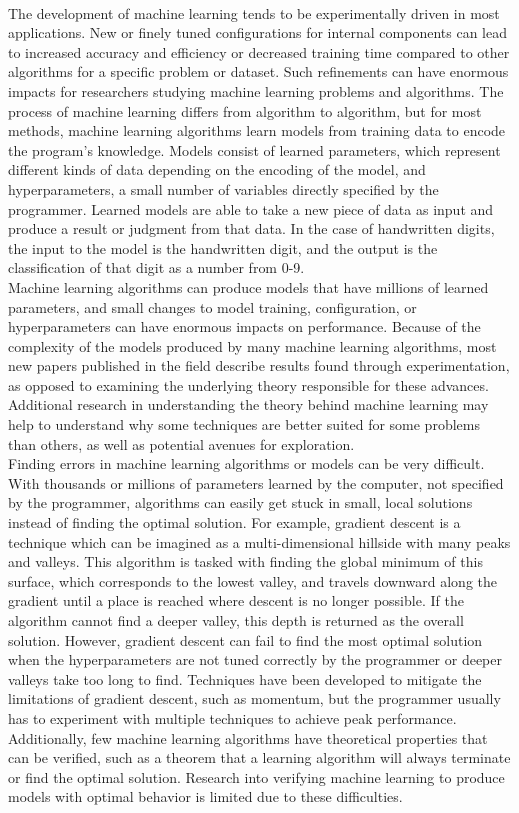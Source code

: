 \\The development of machine learning tends to be experimentally driven in most applications. New or finely tuned configurations for internal components can lead to increased accuracy and efficiency or decreased training time compared to other algorithms for a specific problem or dataset. Such refinements can have enormous impacts for researchers studying machine learning problems and algorithms. The process of machine learning differs from algorithm to algorithm, but for most methods, machine learning algorithms learn models from training data to encode the program's knowledge. Models consist of learned parameters, which represent different kinds of data depending on the encoding of the model, and hyperparameters, a small number of variables directly specified by the programmer. Learned models are able to take a new piece of data as input and produce a result or judgment from that data. In the case of handwritten digits, the input to the model is the handwritten digit, and the output is the classification of that digit as a number from 0-9.
\\Machine learning algorithms can produce models that have millions of learned parameters, and small changes to model training, configuration, or hyperparameters can have enormous impacts on performance. Because of the complexity of the models produced by many machine learning algorithms, most new papers published in the field describe results found through experimentation, as opposed to examining the underlying theory responsible for these advances. Additional research in understanding the theory behind machine learning may help to understand why some techniques are better suited for some problems than others, as well as potential avenues for exploration.
\\Finding errors in machine learning algorithms or models can be very difficult. With thousands or millions of parameters learned by the computer, not specified by the programmer, algorithms can easily get stuck in small, local solutions instead of finding the optimal solution. For example, gradient descent is a technique which can be imagined as a multi-dimensional hillside with many peaks and valleys. This algorithm is tasked with finding the global minimum of this surface, which corresponds to the lowest valley, and travels downward along the gradient until a place is reached where descent is no longer possible. If the algorithm cannot find a deeper valley, this depth is returned as the overall solution. However, gradient descent can fail to find the most optimal solution when the hyperparameters are not tuned correctly by the programmer or deeper valleys take too long to find. Techniques have been developed to mitigate the limitations of gradient descent, such as momentum, but the programmer usually has to experiment with multiple techniques to achieve peak performance. Additionally, few machine learning algorithms have theoretical properties that can be verified, such as a theorem that a learning algorithm will always terminate or find the optimal solution. Research into verifying machine learning to produce models with optimal behavior is limited due to these difficulties.
